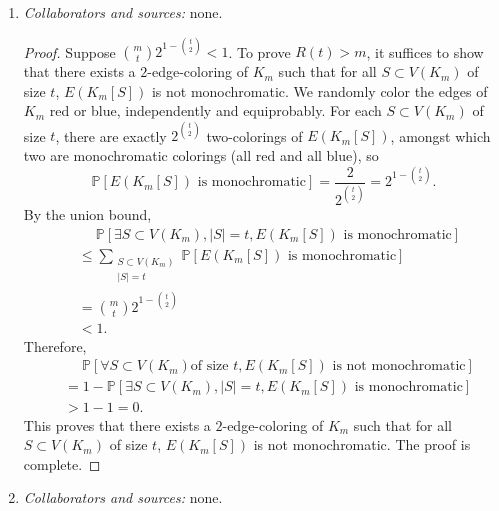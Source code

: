 \documentclass[letterpaper, reqno,11pt]{article}
\newcommand{\PP}{\mathbb{P}}
\begin{document}
\begin{enumerate}
  \clearpage

  \item \noindent\emph{Collaborators and sources:} none.

  \bigskip

  \begin{proof}
    Suppose $\binom{m}{t} 2^{1 - \binom{t}{2}} < 1$. To prove $R(t) > m$, it suffices to show that there exists a $2$-edge-coloring of $K_m$ such that for all $S \subset V(K_m)$ of size $t$, $E(K_m[S])$ is not monochromatic. We randomly color the edges of $K_m$ red or blue, independently and equiprobably. For each $S \subset V(K_m)$ of size $t$, there are exactly $2^{\binom{t}{2}}$ two-colorings of $E(K_m[S])$, amongst which two are monochromatic colorings (all red and all blue), so
    $$ \PP\left[\text{$E\left(K_m[S]\right)$ is monochromatic}\right] = \frac{2}{2^{\binom{t}{2}}} = 2^{1 - \binom{t}{2}}. $$
    By the union bound,
    \begin{align*}
      &\quad \; \PP\left[\exists S \subset V\left(K_m\right), |S| = t, \text{$E\left(K_m[S]\right)$ is monochromatic}\right] \\
      &\leq \sum_{\substack{S \subset V\left(K_m\right) \\ |S| = t}} \PP\left[\text{$E\left(K_m[S]\right)$ is monochromatic}\right] \\
      &= \binom{m}{t} 2^{1 - \binom{t}{2}} \\
      &< 1.
    \end{align*}
    Therefore,
    \begin{align*}
      &\quad\; \PP\left[\forall S \subset V\left(K_m\right) \text{of size $t$}, \text{$E\left(K_m[S]\right)$ is not monochromatic}\right] \\
      &= 1 - \PP\left[\exists S \subset V\left(K_m\right), |S| = t, \text{$E\left(K_m[S]\right)$ is monochromatic}\right] \\
      &> 1 - 1 = 0.
    \end{align*}
    This proves that there exists a $2$-edge-coloring of $K_m$ such that for all $S \subset V(K_m)$ of size $t$, $E(K_m[S])$ is not monochromatic. The proof is complete.
  \end{proof}

  \clearpage

  \item \noindent\emph{Collaborators and sources:} none.

  \bigskip
  

\end{enumerate}
\end{document}
